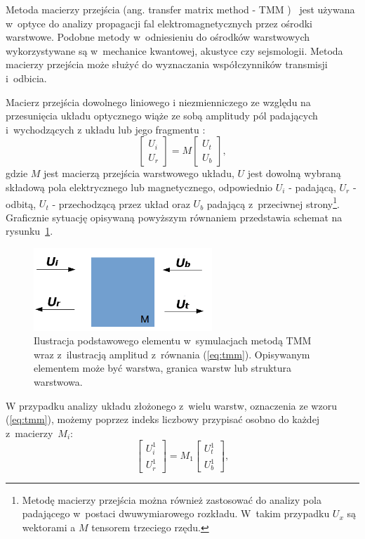 \label{subart:tmm}
Metoda macierzy przejścia  (ang. transfer matrix method - TMM )~\cite{teich1991fundamentalsTMM} jest używana w~optyce do analizy propagacji fal elektromagnetycznych przez ośrodki warstwowe. Podobne metody w~odniesieniu do ośrodków warstwowych wykorzystywane są w~mechanice kwantowej, akustyce czy sejsmologii. Metoda macierzy przejścia może służyć do wyznaczania współczynników transmisji i~odbicia.

Macierz przejścia dowolnego liniowego i niezmienniczego ze względu na przesunięcia układu optycznego wiąże ze sobą amplitudy pól padających i~wychodzących z układu lub jego fragmentu \cite{markos2008wave,teich1991fundamentalsTMM}:
\begin{equation}
\begin{bmatrix}
U_i \\ 
U_r
\end{bmatrix}
= M 
\begin{bmatrix}
U_t \\
U_b
\end{bmatrix},
\label{eq:tmm}
\end{equation}
gdzie $M$ jest macierzą przejścia warstwowego układu, $U$ jest dowolną wybraną składową pola elektrycznego lub magnetycznego, odpowiednio $U_i$ - padającą, $U_r$ - odbitą, $U_t$ - przechodzącą przez układ oraz $U_b$ padającą  z~przeciwnej strony\footnote{Metodę macierzy przejścia można również zastosować do analizy pola padającego w~postaci dwuwymiarowego rozkładu. W~takim przypadku $U_x$ są wektorami a $M$ tensorem trzeciego rzędu.}. Graficznie sytuację opisywaną powyższym równaniem przedstawia schemat na rysunku~\ref{fig:tmm-simple}.

\begin{figure}
	\includegraphics[width=0.6\textwidth]{images/tmm.png}
	\caption{Ilustracja podstawowego elementu w~symulacjach metodą TMM wraz z~ilustracją amplitud z~równania (\ref{eq:tmm}). Opisywanym elementem może być warstwa, granica warstw lub struktura warstwowa. }
	\label{fig:tmm-simple}
\end{figure}

W przypadku analizy układu złożonego z~wielu warstw, oznaczenia ze wzoru (\ref{eq:tmm}), możemy poprzez indeks liczbowy przypisać osobno do każdej z~macierzy~$M_i$:
\begin{equation}
\begin{bmatrix}
U_i^1 \\ 
U_r^1
\end{bmatrix}
= M_1 
\begin{bmatrix}
U_t^1 \\
U_b^1
\end{bmatrix},
\label{eq:tmm-1l}
\end{equation}

